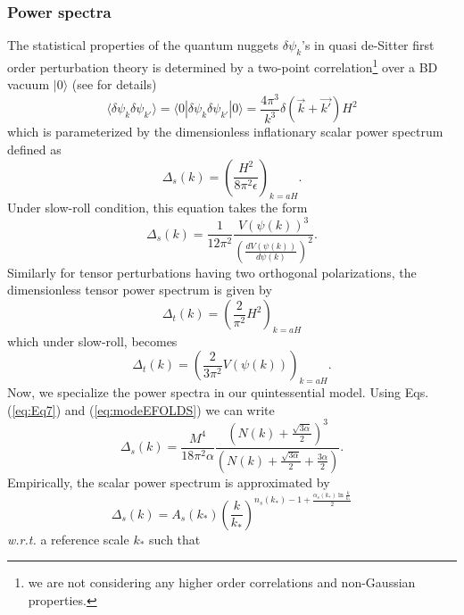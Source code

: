 \documentclass[a4paper,11pt]{article}
\begin{document}
\subsubsection{Power spectra}
\label{subsec:POWERspecSUBSEC}
The statistical properties of the quantum nuggets $\delta\psi_k$'s in quasi de-Sitter first order perturbation theory is determined by a two-point correlation\footnote{we are not considering any higher order correlations and non-Gaussian properties.} over a BD vacuum $|0\rangle$ (see \cite{Kundu:2011sg,Jiang:2016nok} for details)
\begin{equation}
    \langle\delta\psi_k\delta\psi_{k'}\rangle =\langle 0|\delta\psi_k\delta\psi_{k'}|0\rangle= \frac{4\pi^3}{k^3}\delta(\Vec{k}+\Vec{k'})H^2
\end{equation}
which is parameterized by the dimensionless inflationary scalar power spectrum defined as \cite{Baumann:2009ds}
\begin{equation}
    \Delta_s (k) = \left(\frac{H^2}{8\pi^2\epsilon}\right)_{k=aH}.
\end{equation}
Under slow-roll condition, this equation takes the form
\begin{equation}
    \Delta_s(k) = \frac{1}{12\pi^2}\frac{V(\psi(k))^3}{\left(\frac{dV(\psi(k))}{d\psi(k)}\right)^2}.
    \label{eq:ScalarPower1}
\end{equation}
Similarly for tensor perturbations having two orthogonal polarizations, the dimensionless tensor power spectrum is given by \cite{Baumann:2009ds}
\begin{equation}
    \Delta_t(k) = \left(\frac{2}{\pi^2}H^2\right)_{k=aH}
\end{equation} which under slow-roll, becomes
\begin{equation}
    \Delta_t(k) = \left(\frac{2}{3\pi^2}V(\psi(k))\right)_{k=aH}.
    \label{eq:TensorPower1}
\end{equation}
Now, we specialize the power spectra in our quintessential model. Using Eqs. (\ref{eq:Eq7}) and (\ref{eq:modeEFOLDS}) we can write
\begin{equation}
    \Delta_s(k) = \frac{M^4}{18\pi^2\alpha}\frac{\left(N(k)+\frac{\sqrt{3\alpha}}{2}\right)^3}{\left(N(k)+\frac{\sqrt{3\alpha}}{2}+\frac{3\alpha}{2}\right)}.
    \label{eq:modeScalarPower}
\end{equation}
Empirically, the scalar power spectrum is approximated by \cite{Baumann:2009ds}
\begin{equation}
    \Delta_s(k)=A_s(k_{*})\left(\frac{k}{k_{*}}\right)^{n_s(k_{*})-1+\frac{\alpha_s(k_{*})\ln{\frac{k}{k_{*}}}}{2}}
\end{equation} \textit{w.r.t.} a reference scale $k_{*}$ such that
\end{document}
